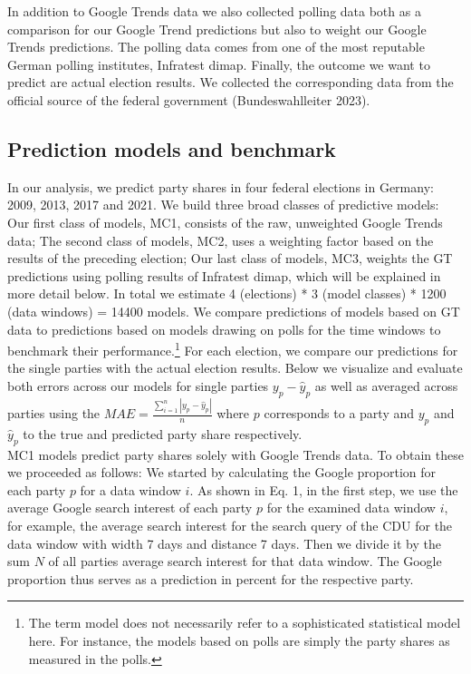\documentclass[
  letterpaper,
  DIV=11,
  numbers=noendperiod]{scrartcl}
\begin{document}
In addition to Google Trends data we also collected polling data both as
a comparison for our Google Trend predictions but also to weight our
Google Trends predictions. The polling data comes from one of the most
reputable German polling institutes, Infratest dimap. Finally, the
outcome we want to predict are actual election results. We collected the
corresponding data from the oﬃcial source of the federal government
(Bundeswahlleiter 2023).

\hypertarget{sec-models}{%
\subsection{Prediction models and benchmark}\label{sec-models}}

In our analysis, we predict party shares in four federal elections in
Germany: 2009, 2013, 2017 and 2021. We build three broad classes of
predictive models:\\
Our first class of models, MC1, consists of the raw, unweighted Google
Trends data; The second class of models, MC2, uses a weighting factor
based on the results of the preceding election; Our last class of
models, MC3, weights the GT predictions using polling results of
Infratest dimap, which will be explained in more detail below. In total
we estimate 4 (elections) * 3 (model classes) * 1200 (data windows) =
14400 models. We compare predictions of models based on GT data to
predictions based on models drawing on polls for the time windows to
benchmark their performance.\footnote{The term model does not
  necessarily refer to a sophisticated statistical model here. For
  instance, the models based on polls are simply the party shares as
  measured in the polls.} For each election, we compare our predictions
for the single parties with the actual election results. Below we
visualize and evaluate both errors across our models for single parties
\(y_{p}-\hat{y}_{p}\) as well as averaged across parties using the
\(MAE = \frac{\sum_{i=1}^{n}|y_{p}-\hat{y}_{p}|}{n}\) where \(p\)
corresponds to a party and \(y_{p}\) and \(\hat{y}_{p}\) to the true and
predicted party share respectively.\\
MC1 models predict party shares solely with Google Trends data. To
obtain these we proceeded as follows: We started by calculating the
Google proportion for each party \(p\) for a data window \(i\). As shown
in Eq. 1, in the ﬁrst step, we use the average Google search interest of
each party \(p\) for the examined data window \(i\), for example, the
average search interest for the search query of the CDU for the data
window with width 7 days and distance 7 days. Then we divide it by the
sum \(N\) of all parties average search interest for that data window.
The Google proportion thus serves as a prediction in percent for the
respective party.
\end{document}
